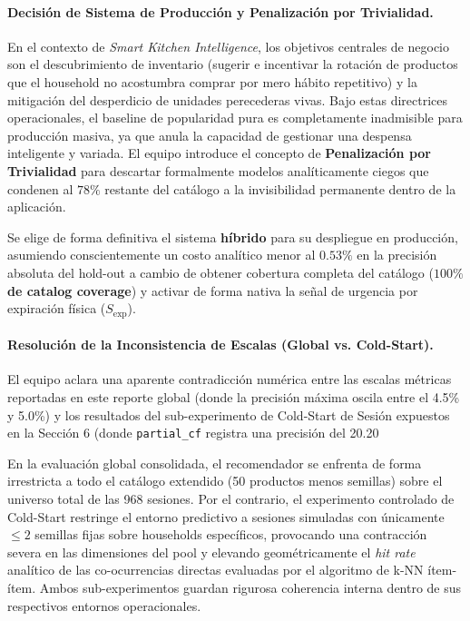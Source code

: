 \documentclass[12pt,a4paper]{article}
\newcommand{\metric}[1]{\textcolor{metricblue}{\textbf{#1}}}
\newcommand{\winner}[1]{\textcolor{successgreen}{\textbf{#1}}}
\newcommand{\code}[1]{\texttt{\small #1}}
\begin{document}
\paragraph{Decisión de Sistema de Producción y Penalización por Trivialidad.} 
En el contexto de \textit{Smart Kitchen Intelligence}, los objetivos centrales de negocio son el descubrimiento de inventario (sugerir e incentivar la rotación de productos que el household no acostumbra comprar por mero hábito repetitivo) y la mitigación del desperdicio de unidades perecederas vivas. Bajo estas directrices operacionales, el baseline de popularidad pura es completamente inadmisible para producción masiva, ya que anula la capacidad de gestionar una despensa inteligente y variada. El equipo introduce el concepto de \textbf{Penalización por Trivialidad} para descartar formalmente modelos analíticamente ciegos que condenen al $78\%$ restante del catálogo a la invisibilidad permanente dentro de la aplicación. 

Se elige de forma definitiva el sistema \winner{híbrido} para su despliegue en producción, asumiendo conscientemente un costo analítico menor al $0.53\%$ en la precisión absoluta del hold-out a cambio de obtener cobertura completa del catálogo (\metric{$100\%$ de catalog coverage}) y activar de forma nativa la señal de urgencia por expiración física ($S_{\text{exp}}$).

\paragraph{Resolución de la Inconsistencia de Escalas (Global vs. Cold-Start).} El equipo aclara una aparente contradicción numérica entre las escalas métricas reportadas en este reporte global (donde la precisión máxima oscila entre el 4.5\% y 5.0\%) y los resultados del sub-experimento de Cold-Start de Sesión expuestos en la Sección 6 (donde \code{partial\_cf} registra una precisión del 20.20%

En la evaluación global consolidada, el recomendador se enfrenta de forma irrestricta a todo el catálogo extendido (50 productos menos semillas) sobre el universo total de las 968 sesiones. Por el contrario, el experimento controlado de Cold-Start restringe el entorno predictivo a sesiones simuladas con únicamente $\le 2$ semillas fijas sobre households específicos, provocando una contracción severa en las dimensiones del pool y elevando geométricamente el \textit{hit rate} analítico de las co-ocurrencias directas evaluadas por el algoritmo de k-NN ítem-ítem. Ambos sub-experimentos guardan rigurosa coherencia interna dentro de sus respectivos entornos operacionales.
\end{document}
